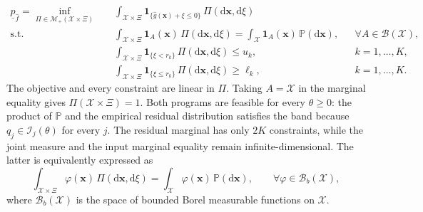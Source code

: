 \documentclass[review,11pt,3p,authoryear,nopreprintline]{elsarticle}
\begin{document}
\begin{equation}
  \begin{aligned}
    \underline p_{\hat f}
    =\inf_{\Pi\in\mathcal M_+(\mathcal X\times\Xi)}\quad&
    \int_{\mathcal X\times\Xi}
    \mathbf1_{\{\hat g(\bm x)+\xi\le0\}}\,\Pi\left(\mathrm d\bm x,\mathrm d\xi\right)\\
    \text{s.t.}\quad&
    \int_{\mathcal X\times\Xi}\mathbf1_A(\bm x)\,\Pi\left(\mathrm d\bm x,\mathrm d\xi\right)
    =\int_{\mathcal X}\mathbf1_A(\bm x)\,\mathbb P\left(\mathrm d\bm x\right),
    &&\forall A\in\mathcal B(\mathcal X),\\
    &\int_{\mathcal X\times\Xi}
    \mathbf1_{\{\xi<r_k\}}\,\Pi\left(\mathrm d\bm x,\mathrm d\xi\right)\le u_k,
    &&k=1,\ldots,K,\\
    &\int_{\mathcal X\times\Xi}
    \mathbf1_{\{\xi\le r_k\}}\,\Pi\left(\mathrm d\bm x,\mathrm d\xi\right)\ge\ell_k,
    &&k=1,\ldots,K.
  \end{aligned}
  \label{eq-measure-lower}
\end{equation}
The objective and every constraint are linear in $\Pi$. Taking $A=\mathcal X$ in the marginal equality gives $\Pi(\mathcal X\times\Xi)=1$. Both programs are feasible for every $\theta\ge0$: the product of $\mathbb P$ and the empirical residual distribution satisfies the band because $q_j\in\mathcal I_j(\theta)$ for every $j$. The residual marginal has only $2K$ constraints, while the joint measure and the input marginal equality remain infinite-dimensional. The latter is equivalently expressed as
\begin{equation}
  \int_{\mathcal X\times\Xi}\varphi(\bm x)\,\Pi\left(\mathrm d\bm x,\mathrm d\xi\right)
  =\int_{\mathcal X}\varphi(\bm x)\,\mathbb P\left(\mathrm d\bm x\right),
  \qquad\forall\varphi\in\mathcal B_b(\mathcal X),
  \label{eq-marginal-test-functions}
\end{equation}
where $\mathcal B_b(\mathcal X)$ is the space of bounded Borel measurable functions on $\mathcal X$.
\end{document}
